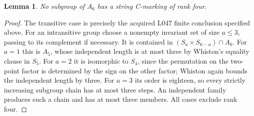 \documentclass[11pt,a4paper]{article}
\newtheorem{lemma}[theorem]{Lemma}
\begin{document}
\begin{lemma}\label{six}
No subgroup of $A_6$ has a string C-marking of rank four.
\end{lemma}
\begin{proof}
The transitive case is precisely the acquired L047 finite conclusion
specified above. For an intransitive group choose a nonempty invariant
set of size $a\le3$, passing to its complement if necessary. It is
contained in $(S_a\times S_{6-a})\cap A_6$. For $a=1$ this is $A_5$,
whose independent length is at most three by Whiston's equality clause
in $S_5$. For $a=2$ it is isomorphic to $S_4$, since the permutation
on the two-point factor is determined by the sign on the other factor;
Whiston again bounds the independent length by three. For $a=3$ its
order is eighteen, so every strictly increasing subgroup chain has at
most three steps. An independent family produces such a chain and has
at most three members. All cases exclude rank four.
\end{proof}
\end{document}
